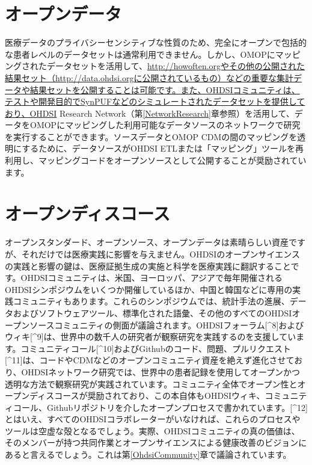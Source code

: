 \documentclass[
  11pt]{book}
\theoremstyle{definition}
\theoremstyle{definition}
\theoremstyle{definition}
\theoremstyle{definition}
\theoremstyle{remark}
\begin{document}
\section{オープンデータ}\label{ux30aaux30fcux30d7ux30f3ux30c7ux30fcux30bf}


医療データのプライバシーセンシティブな性質のため、完全にオープンで包括的な患者レベルのデータセットは通常利用できません。しかし、OMOPにマッピングされたデータセットを活用して、\url{http://howoften.orgやその他の公開された結果セット（http://data.ohdsi.orgに公開されているもの）などの重要な集計データや結果セットを公開することは可能です。また、OHDSIコミュニティは、テストや開発目的でSynPUFなどのシミュレートされたデータセットを提供しており、OHDSI} Research Network（第\ref{NetworkResearch}章参照）を活用して、データをOMOPにマッピングした利用可能なデータソースのネットワークで研究を実行することができます。ソースデータとOMOP CDMの間のマッピングを透明にするために、データソースがOHDSI ETLまたは「マッピング」ツールを再利用し、マッピングコードをオープンソースとして公開することが奨励されています。

\section{オープンディスコース}\label{ux30aaux30fcux30d7ux30f3ux30c7ux30a3ux30b9ux30b3ux30fcux30b9}


オープンスタンダード、オープンソース、オープンデータは素晴らしい資産ですが、それだけでは医療実践に影響を与えません。OHDSIのオープンサイエンスの実践と影響の鍵は、医療証拠生成の実施と科学を医療実践に翻訳することです。OHDSIコミュニティは、米国、ヨーロッパ、アジアで毎年開催されるOHDSIシンポジウムをいくつか開催しているほか、中国と韓国などに専用の実践コミュニティもあります。これらのシンポジウムでは、統計手法の進展、データおよびソフトウェアツール、標準化された語彙、その他のすべてのOHDSIオープンソースコミュニティの側面が議論されます。OHDSIフォーラム{[}\^{}8{]}およびウィキ{[}\^{}9{]}は、世界中の数千人の研究者が観察研究を実践するのを支援しています。コミュニティコール{[}\^{}10{]}およびGithubのコード、問題、プルリクエスト{[}\^{}11{]}は、コードやCDMなどのオープンコミュニティ資産を絶えず進化させており、OHDSIネットワーク研究では、世界中の患者記録を使用してオープンかつ透明な方法で観察研究が実践されています。コミュニティ全体でオープン性とオープンディスコースが奨励されており、この本自体もOHDSIウィキ、コミュニティコール、Githubリポジトリを介したオープンプロセスで書かれています。{[}\^{}12{]} とはいえ、すべてのOHDSIコラボレーターがいなければ、これらのプロセスやツールは空虚な殻となるでしょう。実際、OHDSIコミュニティの真の価値は、そのメンバーが持つ共同作業とオープンサイエンスによる健康改善のビジョンにあると言えるでしょう。これは第\ref{OhdsiCommunity}章で議論されています。
\end{document}
